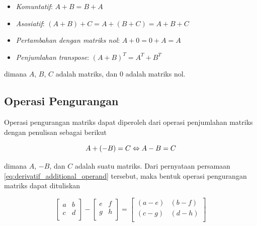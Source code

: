 \begin{itemize}
  \label{property_additional_matrix}

  \item \emph{Komuntatif}: $A + B = B + A$

  \item \emph{Asosiatif}: $(A + B) + C = A + (B + C) = A + B + C$

  \item \emph{Pertambahan dengan matriks nol}: $A + 0 = 0 + A = A$

  \item \emph{Penjumlahan transpose}: $(A + B)^{T}= A^{T}+ B^{T}$
\end{itemize}

\noindent
dimana $A$, $B$, $C$ adalah matriks, dan $0$ adalah matriks nol.

\subsection{Operasi Pengurangan}

Operasi pengurangan matriks dapat diperoleh dari operasi penjumlahan matriks
dengan penulisan sebagai berikut

\begin{equation}
  \label{eq:derivatif_additional_operand}A + (-B) = C\\ \Leftrightarrow A - B = C
\end{equation}

\noindent
dimana $A$, $-B$, dan $C$ adalah suatu matriks. Dari pernyataan persamaan \ref{eq:derivatif_additional_operand}
tersebut, maka bentuk operasi pengurangan matriks dapat dituliskan

\begin{equation}
  \label{eq:matrix_substraction}
  \begin{bmatrix}
    a & b \\
    c & d \\
  \end{bmatrix}
  -
  \begin{bmatrix}
    e & f \\
    g & h \\
  \end{bmatrix}
  =
  \begin{bmatrix}
    (a - e) & (b - f) \\
    (c - g) & (d - h) \\
  \end{bmatrix}
\end{equation}

